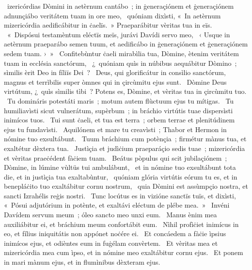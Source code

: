 { }
{%
~izericórdias Dòmini in aetèrnum cantábo~; in ġeneraçiónem et ġeneraçiónem adnunçiábo veritátem tuam in ore meo, 
~quóniam dixìsti, «~In aetèrnum mizericórdia aedificábitur in ċaelïs.~» Praeparábitur vèritas tua in eïs. 
~«~Dispósui testamèntum eléctïs meïs, jurávi Davídi servo meo, 
~‹ Usque in aetèrnum praeparábo semen tuum, et aedificábo in ġeneraçiónem et ġeneraçiónem sedem tuam. ›~»
~Confitebùntur ċaeli mirabìlia tua, Dòmine, ètenim veritátem tuam in ecclésia sanctórum, 
~¿~quóniam quìs in núbibus aequábitur Dòmino~; sìmilis èrit Deo in fíliïs Dei~? 
~Deus, qui glorificátur in consìlio sanctórum, magnus et terrìbilis super òmnes qui in çircùmitu ejus sunt. 
~Dòmine Deus virtútum, ¿~quìs sìmilis tìbi~? Potens es, Dòmine, et vèritas tua in çircùmitu tuo. 
~Tu domináris potestáti maris~; motum autem flùctuum ejus tu mítigas. 
~Tu humiliavìsti sicut vulnerátum, supèrbum~; in bráchio virtútis tuae dispersìsti inimícos tuos. 
~Tui sunt ċaeli, et tua est terra~; orbem terrae et plenitúdinem ejus tu fundavìsti. 
~Aquilónem et mare tu creavìsti~; Thabor et Hermon in nómine tuo exsultábunt. 
~Tuum bráchium cum potènçia~; firmétur mànus tua, et exaltétur dèxtera tua. 
~Justìçia et judìċium praeparáçio sedis tuae~; mizericórdia et vèritas praeċédent fàċiem tuam. 
~Beátus pòpulus qui scit jubilaçiónem~; Dòmine, in lúmine vùltüs tui ambulábunt, 
~et in nómine tuo exsultábunt tota die, et in justìçia tua exaltabùntur, 
~quóniam glória virtútis eórum tu es, et in benepláċito tuo exaltábitur cornu nostrum, 
~quia Dòmini est assùmpçio nostra, et sancti Izrahélis reġis nostri. 
~Tunc locútus es in vizióne sanctïs tuïs, et dixìsti, «~Pósui adjutórium in potènte, et exaltávi eléctum de plébe mea.~» 
~Invéni Davídem servum meum~; óleo sancto meo unxi eum. 
~Manus ènim mea auxiliábitur ei, et bráchium meum confortábit eum. 
~Nìhil profìċiet inimícus in eo, et fílius iniquitátis non appónet noċére ei. 
~Et concáedem a fàċie ìpsius inimícos ejus, et odièntes eum in fuġélam convèrtem. 
~Et vèritas mea et mizericórdia mea cum ìpso, et in nómine meo exaltábitur cornu ejus. 
~Et ponem in mari mànum ejus, et in flumìnibus dèxteram ejus. 
}
